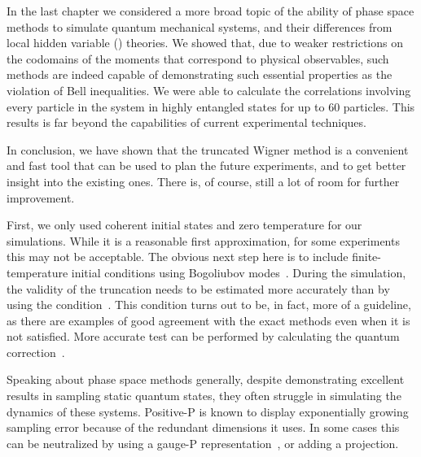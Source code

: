 In the last chapter we considered a more broad topic of the ability of phase space methods to simulate quantum mechanical systems, and their differences from local hidden variable () theories.
We showed that, due to weaker restrictions on the codomains of the moments that correspond to physical observables, such methods are indeed capable of demonstrating such essential  properties as the violation of Bell inequalities.
We were able to calculate the correlations involving every particle in the system in highly entangled  states for up to $60$ particles.
This results is far beyond the capabilities of current experimental techniques.

\centerline{\vfleuron}

In conclusion, we have shown that the truncated Wigner method is a convenient and fast tool that can be used to plan the future experiments, and to get better insight into the existing ones.
There is, of course, still a lot of room for further improvement.

First, we only used coherent initial states and zero temperature for our simulations.
While it is a reasonable first approximation, for some experiments this may not be acceptable.
The obvious next step here is to include finite-temperature initial conditions using Bogoliubov modes~\cite{Steel1998,Sinatra2002,Ruostekoski2005,Isella2006,Blakie2008}.
During the simulation, the validity of the truncation needs to be estimated more accurately than by using the condition~.
This condition turns out to be, in fact, more of a guideline, as there are examples of good agreement with the exact methods even when it is not satisfied.
More accurate test can be performed by calculating the quantum correction~\cite{Polkovnikov2010}.

Speaking about phase space methods generally, despite demonstrating excellent results in sampling static quantum states, they often struggle in simulating the dynamics of these systems.
Positive-P is known to display exponentially growing sampling error because of the redundant dimensions it uses.
In some cases this can be neutralized by using a gauge-P representation~\cite{Deuar2002,Deuar2005a}, or adding a projection.
